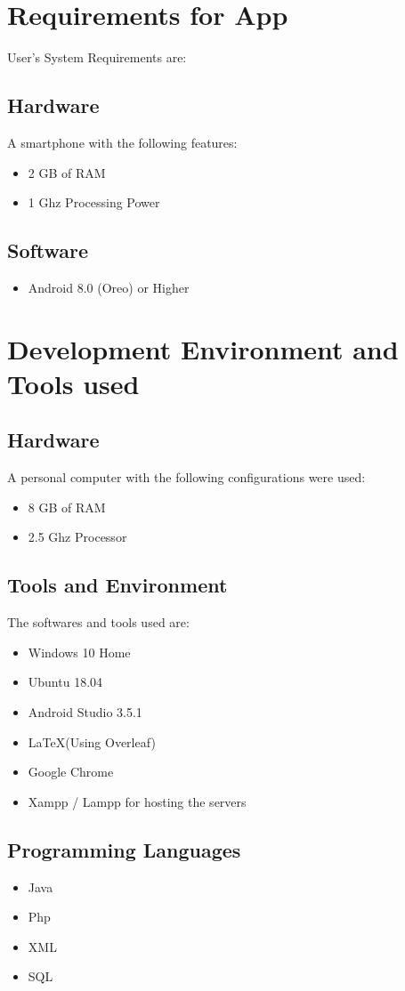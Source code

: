 \documentclass[12pt, a4paper]{article}
\begin{document}
\section{\textbf{Requirements for App}}
User's System Requirements are:
\subsection{Hardware}
A smartphone with the following features:
\begin{itemize}
    \item 2 GB of RAM
    \item 1 Ghz Processing Power
\end{itemize}
\subsection{Software}
\begin{itemize}
    \item Android 8.0 (Oreo) or Higher
\end{itemize}
\section{Development Environment and Tools used}
\subsection{Hardware}
A personal computer with the following configurations were used:
\begin{itemize}
    \item 8 GB of RAM
    \item 2.5 Ghz Processor
\end{itemize}
\subsection{Tools and Environment}
The softwares and tools used are:
\begin{itemize}
    \item Windows 10 Home
    \item Ubuntu 18.04
    \item Android Studio 3.5.1
    \item \LaTeX (Using Overleaf)
    \item Google Chrome
    \item Xampp / Lampp for hosting the servers
\end{itemize}
\subsection{\textbf{Programming Languages}}
\begin{itemize}
    \item Java 
    \item Php
    \item XML
    \item SQL
\end{itemize}
\end{document}
